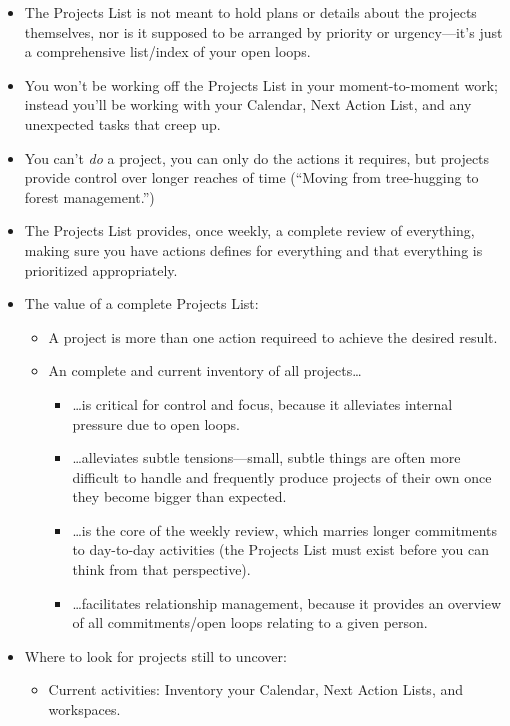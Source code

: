 \documentclass{article}
\begin{document}
\begin{itemize}
  \item The Projects List is not meant to hold plans or details about the projects themselves, nor is it supposed to be arranged by priority or urgency---it's just a comprehensive list/index of your open loops.
  \item You won't be working off the Projects List in your moment-to-moment work; instead you'll be working with your Calendar, Next Action List, and any unexpected tasks that creep up.
  \item You can't \emph{do} a project, you can only do the actions it requires, but projects provide control over longer reaches of time (``Moving from tree-hugging to forest management.'')
  \item The Projects List provides, once weekly, a complete review of everything, making sure you have actions defines for everything and that everything is prioritized appropriately.
  \item The value of a complete Projects List:
  \begin{itemize}
    \item A project is more than one action requireed to achieve the desired result.
    \item An complete and current inventory of all projects\ldots
    \begin{itemize}
      \item \ldots is critical for control and focus, because it alleviates internal pressure due to open loops.
      \item \ldots alleviates subtle tensions---small, subtle things are often more difficult to handle and frequently produce projects of their own once they become bigger than expected.
      \item \ldots is the core of the weekly review, which marries longer commitments to day-to-day activities (the Projects List must exist before you can think from that perspective).
      \item \ldots facilitates relationship management, because it provides an overview of all commitments/open loops relating to a given person.
    \end{itemize}
  \end{itemize}
  \item Where to look for projects still to uncover:
  \begin{itemize}
    \item Current activities: Inventory your Calendar, Next Action Lists, and workspaces.

\end{itemize}
\end{itemize}
\end{document}
